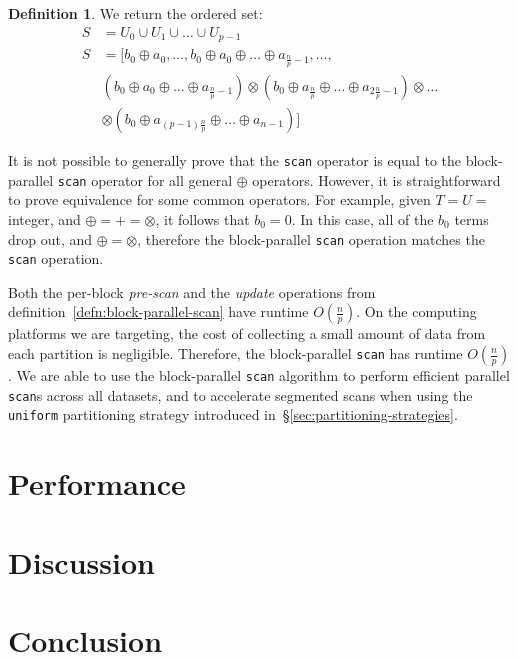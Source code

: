 \documentclass[preprint]{sigplanconf}
\theoremstyle{definition}
\newtheorem{defn}{Definition}
\begin{document}
\begin{defn}
We return the ordered set:
\begin{equation*}
\begin{split}
S &=U_0 \cup U_1 \cup \ldots \cup U_{p - 1} \\
S &= [b_0 \oplus a_0, \ldots, b_0 \oplus a_0 \oplus \ldots \oplus a_{\frac{n}{p} - 1}, \ldots, \\
 &(b_0 \oplus
a_0 \oplus \ldots \oplus a_{\frac{n}{p} - 1}) \otimes (b_0 \oplus a_{\frac{n}{p}} \oplus \ldots \oplus
a_{2\frac{n}{p} - 1}) \otimes \ldots \\
& \otimes (b_0 \oplus a_{(p - 1)\frac{n}{p}} \oplus \ldots \oplus a_{n - 1})]
\end{split}
\end{equation*}
\end{defn}

It is not possible to generally prove that the \texttt{scan} operator is equal to the block-parallel
\texttt{scan} operator for all general $\oplus$ operators. However, it is straightforward to prove
equivalence for some common operators. For example, given $T = U =$ integer, and $\oplus = +
= \otimes$, it follows that $b_0 = 0$. In this case, all of the $b_0$ terms drop out, and $\oplus =
\otimes$, therefore the block-parallel \texttt{scan} operation matches the \texttt{scan} operation.

Both the per-block \emph{pre-scan} and the \emph{update} operations from
definition~\ref{defn:block-parallel-scan} have runtime $O(\frac{n}{p})$. On the computing platforms we
are targeting, the cost of collecting a small amount of data from each partition is negligible. Therefore,
the block-parallel \texttt{scan} has runtime $O(\frac{n}{p})$. We are able to use the block-parallel
\texttt{scan} algorithm to perform efficient parallel \texttt{scan}s across all datasets, and to accelerate
segmented scans when using the \texttt{uniform} partitioning strategy introduced
in~\S\ref{sec:partitioning-strategies}.

\section{Performance}
\label{sec:performance}

\section{Discussion}
\label{sec:discussion}

\section{Conclusion}
\label{sec:conclusion}




\end{document}
